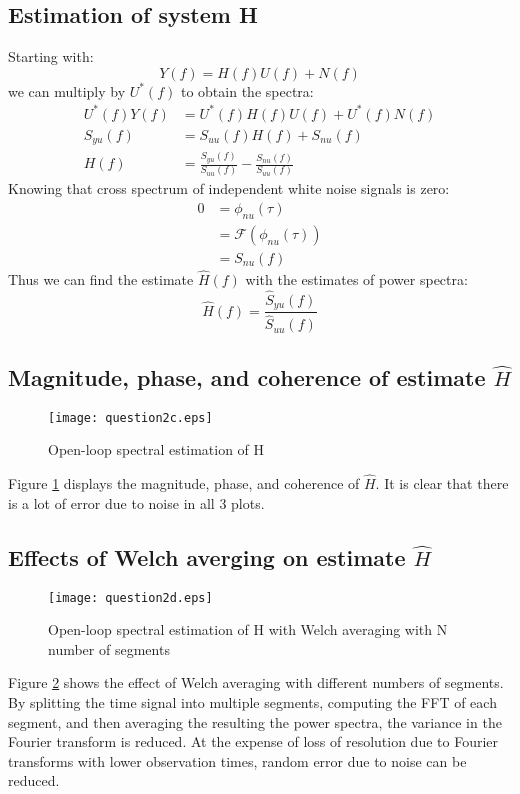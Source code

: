 \documentclass[11pt,a4paper]{article}
\begin{document}
\subsection{Estimation of system H}
Starting with:
\begin{equation*}
    Y(f) = H(f)U(f) + N(f)
\end{equation*}
we can multiply by $U^*(f)$ to obtain the spectra:
\begin{align*}
    U^*(f)Y(f) &= U^*(f)H(f)U(f) + U^*(f)N(f) \\
    S_{yu}(f) &= S_{uu}(f)H(f) + S_{nu}(f) \\
    H(f) &= \frac{S_{yu}(f)}{S_{uu}(f)}  - \frac{S_{nu}(f)}{S_{uu}(f)}
\end{align*}
Knowing that cross spectrum of independent white noise signals is zero:
\begin{align*}
    0 &= \phi_{nu}(\tau) \\
      &= \mathcal{F}(\phi_{nu}(\tau)) \\
      &= S_{nu}(f)
\end{align*}
Thus we can find the estimate $\hat{H}(f)$ with the estimates of power spectra:
\begin{equation*}
    \hat{H}(f) = \frac{\hat{S}_{yu}(f)}{\hat{S}_{uu}(f)}
\end{equation*}


\subsection{Magnitude, phase, and coherence of estimate $\hat{H}$}
\begin{figure}
    \begin{center}
        \texttt{[image: question2c.eps]}
    \end{center}
    \caption{Open-loop spectral estimation of H}
    \label{fig:2c}
\end{figure}
Figure \ref{fig:2c} displays the magnitude, phase, and coherence of $\hat{H}$. It
is clear that there is a lot of error due to noise in all 3 plots.

\subsection{Effects of Welch averging on estimate $\hat{H}$}
\begin{figure}
    \begin{center}
        \texttt{[image: question2d.eps]}
    \end{center}
    \caption{Open-loop spectral estimation of H with Welch averaging with
    N number of segments}
    \label{fig:2d}
\end{figure}
Figure \ref{fig:2d} shows the effect of Welch averaging with different numbers
of segments. By splitting the time signal into multiple segments, computing the
FFT of each segment, and then averaging the resulting the power spectra, the
variance in the Fourier transform is reduced. At the expense of loss of
resolution due to Fourier transforms with lower observation times, random error
due to noise can be reduced.
\end{document}
